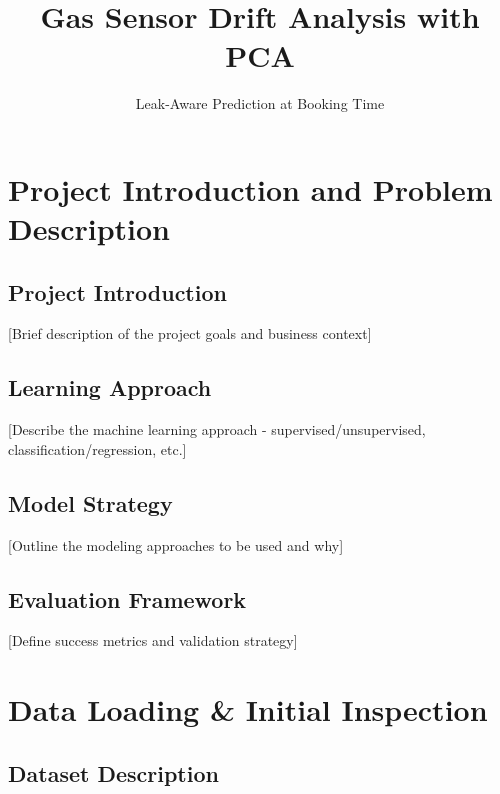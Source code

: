 \documentclass[
  letterpaper,
  DIV=11,
  numbers=noendperiod]{scrartcl}
\title{Gas Sensor Drift Analysis with PCA}
\subtitle{Leak-Aware Prediction at Booking Time}
\author{}
\date{}
\renewcommand*\contentsname{Table of contents}
\newcommand\contentsname{Table of contents}
\begin{document}
\maketitle

\renewcommand*\contentsname{Table of contents}
{
\hypersetup{linkcolor=}
\setcounter{tocdepth}{3}
\tableofcontents
}

\section{Project Introduction and Problem
Description}\label{project-introduction-and-problem-description}

\subsection{Project Introduction}\label{project-introduction}

{[}Brief description of the project goals and business context{]}

\subsection{Learning Approach}\label{learning-approach}

{[}Describe the machine learning approach - supervised/unsupervised,
classification/regression, etc.{]}

\subsection{Model Strategy}\label{model-strategy}

{[}Outline the modeling approaches to be used and why{]}

\subsection{Evaluation Framework}\label{evaluation-framework}

{[}Define success metrics and validation strategy{]}

\section{Data Loading \& Initial
Inspection}\label{data-loading-initial-inspection}

\subsection{Dataset Description}\label{dataset-description}
\end{document}
